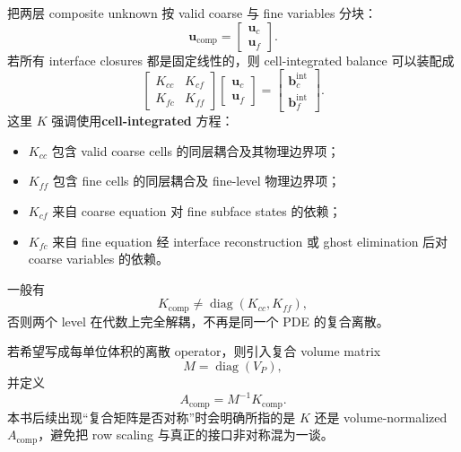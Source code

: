 把两层 composite unknown 按 valid coarse 与 fine variables 分块：
\begin{equation}
\bm u_{\mathrm{comp}}
=
\begin{bmatrix}
\bm u_c\\
\bm u_f
\end{bmatrix}.
\end{equation}
若所有 interface closures 都是固定线性的，则 cell-integrated balance 可以装配成
\begin{equation}
\boxed{
\begin{bmatrix}
K_{cc}&K_{cf}\\
K_{fc}&K_{ff}
\end{bmatrix}
\begin{bmatrix}
\bm u_c\\
\bm u_f
\end{bmatrix}
=
\begin{bmatrix}
\bm b_c^{\mathrm{int}}\\
\bm b_f^{\mathrm{int}}
\end{bmatrix}.
}
\label{eq:amr_block_matrix}
\end{equation}
这里 $K$ 强调使用\textbf{cell-integrated} 方程：
\begin{itemize}
\item $K_{cc}$ 包含 valid coarse cells 的同层耦合及其物理边界项；
\item $K_{ff}$ 包含 fine cells 的同层耦合及 fine-level 物理边界项；
\item $K_{cf}$ 来自 coarse equation 对 fine subface states 的依赖；
\item $K_{fc}$ 来自 fine equation 经 interface reconstruction 或 ghost elimination 后对 coarse variables 的依赖。
\end{itemize}
一般有
\begin{equation}
K_{\mathrm{comp}}
\neq
\operatorname{diag}(K_{cc},K_{ff}),
\end{equation}
否则两个 level 在代数上完全解耦，不再是同一个 PDE 的复合离散。

若希望写成每单位体积的离散 operator，则引入复合 volume matrix
\begin{equation}
M=\operatorname{diag}(V_P),
\end{equation}
并定义
\begin{equation}
A_{\mathrm{comp}}=M^{-1}K_{\mathrm{comp}}.
\label{eq:amr-composite-normalized-operator}
\end{equation}
本书后续出现“复合矩阵是否对称”时会明确所指的是 $K$ 还是 volume-normalized $A_{\mathrm{comp}}$，避免把 row scaling 与真正的接口非对称混为一谈。

